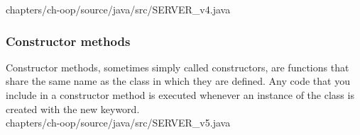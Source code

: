 		
		{chapters/ch-oop/source/java/src/SERVER_v4.java}
	
	
	\subsubsection{Constructor methods}
	Constructor methods, sometimes simply called constructors, 
	are functions that share the same name as the class in 
	which they are defined. Any code that you include in 
	a constructor method is executed whenever an instance of the 
	class is created with the  new  keyword. \\

		 {chapters/ch-oop/source/java/src/SERVER_v5.java}

	